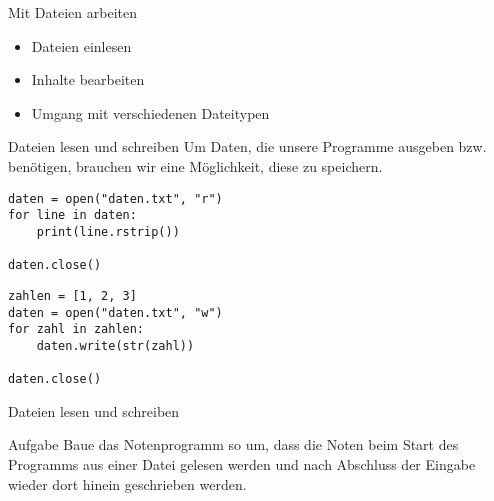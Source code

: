 \begin{frame}[fragile]{Mit Dateien arbeiten}
	\begin{itemize}
		\item Dateien einlesen
		\item Inhalte bearbeiten
		\item Umgang mit verschiedenen Dateitypen
	\end{itemize}
\end{frame}

\begin{frame}[fragile]{Dateien lesen und schreiben}
Um Daten, die unsere Programme ausgeben bzw. benötigen, brauchen wir eine 
Möglichkeit, diese zu speichern.
\pause{}
\begin{lstlisting}
daten = open("daten.txt", "r")
for line in daten:
    print(line.rstrip())

daten.close()
\end{lstlisting}

\pause{}

\begin{lstlisting}
zahlen = [1, 2, 3]
daten = open("daten.txt", "w")
for zahl in zahlen:
    daten.write(str(zahl))

daten.close()
\end{lstlisting}
\end{frame}

\begin{frame}[fragile]{Dateien lesen und schreiben}
\begin{block}{Aufgabe}
Baue das Notenprogramm so um, dass die Noten beim Start des Programms aus einer Datei gelesen 
werden und nach Abschluss der Eingabe wieder dort hinein geschrieben werden.
\end{block}
\end{frame}


